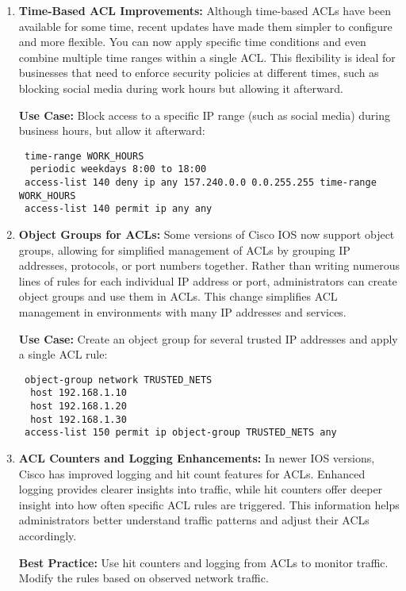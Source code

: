 \documentclass[11pt,a4paper]{article}
\begin{document}
\begin{enumerate}
                \item \textbf{Time-Based ACL Improvements:} Although time-based ACLs have been available for some time, recent updates have made them simpler to configure and more flexible. You can now apply specific time conditions and even combine multiple time ranges within a single ACL. This flexibility is ideal for businesses that need to enforce security policies at different times, such as blocking social media during work hours but allowing it afterward.

                \textbf{Use Case:} Block access to a specific IP range (such as social media) during business hours, but allow it afterward:
\begin{lstlisting}
 time-range WORK_HOURS
  periodic weekdays 8:00 to 18:00
 access-list 140 deny ip any 157.240.0.0 0.0.255.255 time-range WORK_HOURS
 access-list 140 permit ip any any  
\end{lstlisting}

                \item \textbf{Object Groups for ACLs:} Some versions of Cisco IOS now support object groups, allowing for simplified management of ACLs by grouping IP addresses, protocols, or port numbers together. Rather than writing numerous lines of rules for each individual IP address or port, administrators can create object groups and use them in ACLs. This change simplifies ACL management in environments with many IP addresses and services.

                \textbf{Use Case:} Create an object group for several trusted IP addresses and apply a single ACL rule:

\begin{lstlisting}
 object-group network TRUSTED_NETS
  host 192.168.1.10
  host 192.168.1.20
  host 192.168.1.30
 access-list 150 permit ip object-group TRUSTED_NETS any  
\end{lstlisting}

                \item \textbf{ACL Counters and Logging Enhancements:} In newer IOS versions, Cisco has improved logging and hit count features for ACLs. Enhanced logging provides clearer insights into traffic, while hit counters offer deeper insight into how often specific ACL rules are triggered. This information helps administrators better understand traffic patterns and adjust their ACLs accordingly.

                \textbf{Best Practice:} Use hit counters and logging from ACLs to monitor traffic. Modify the rules based on observed network traffic.

            \end{enumerate}
\end{document}
